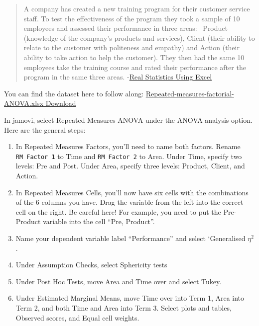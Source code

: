 \documentclass[
]{book}
\begin{document}
\begin{quote}
A company has created a new training program for their customer service staff. To test the effectiveness of the program they took a sample of 10 employees and assessed their performance in three areas: ~Product (knowledge of the company's products and services), Client (their ability to relate to the customer with politeness and empathy) and Action (their ability to take action to help the customer). They then had the same 10 employees take the training course and rated their performance after the program in the same three areas. -\href{A\%20company\%20has\%20created\%20a\%20new\%20training\%20program\%20for\%20their\%20customer\%20service\%20staff.\%20To\%20test\%20the\%20effectiveness\%20of\%20the\%20program\%20they\%20took\%20a\%20sample\%20of\%2010\%20employees\%20and\%20assessed\%20their\%20performance\%20in\%20three\%20areas:\%20Product\%20(knowledge\%20of\%20the\%20company’s\%20products\%20and\%20services),\%20Client\%20(their\%20ability\%20to\%20relate\%20to\%20the\%20customer\%20with\%20politeness\%20and\%20empathy)\%20and\%20Action\%20(their\%20ability\%20to\%20take\%20action\%20to\%20help\%20the\%20customer).\%20They\%20then\%20had\%20the\%20same\%2010\%20employees\%20take\%20the\%20training\%20course\%20and\%20rated\%20their\%20performance\%20after\%20the\%20program\%20in\%20the\%20same\%20three\%20areas.\%20Based\%20on\%20the\%20data\%20in\%20Figure\%201,\%20determine\%20whether\%20the\%20program\%20was\%20effective.}{Real Statistics Using Excel}
\end{quote}

You can find the dataset here to follow along: \href{https://github.com/danawanzer/stats-with-jamovi/blob/master/data/Repeated-measures-factorial-ANOVA.xlsx}{Repeated-measures-factorial-ANOVA.xlsx Download}

In jamovi, select Repeated Measures ANOVA under the ANOVA analysis option. Here are the general steps:

\begin{enumerate}
\def\labelenumi{\arabic{enumi}.}
\item
  In Repeated Measures Factors, you'll need to name both factors. Rename \texttt{RM\ Factor\ 1} to Time and \texttt{RM\ Factor\ 2} to Area. Under Time, specify two levels: Pre and Post. Under Area, specify three levels: Product, Client, and Action.
\item
  In Repeated Measures Cells, you'll now have six cells with the combinations of the 6 columns you have. Drag the variable from the left into the correct cell on the right. Be careful here! For example, you need to put the Pre-Product variable into the cell ``Pre, Product''.
\item
  Name your dependent variable label ``Performance'' and select `Generalised \(\eta^2\).
\item
  Under Assumption Checks, select Sphericity tests
\item
  Under Post Hoc Tests, move Area and Time over and select Tukey.
\item
  Under Estimated Marginal Means, move Time over into Term 1, Area into Term 2, and both Time and Area into Term 3. Select plots and tables, Observed scores, and Equal cell weights.
\end{enumerate}
\end{document}
